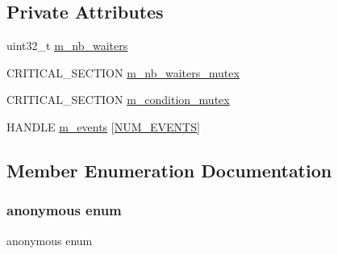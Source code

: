\subsection*{Private Attributes}
\begin{DoxyCompactItemize}
\item 
uint32\+\_\+t \hyperlink{classmage_1_1_condition_variable_ac02cb14000a597ec91b8546bdcbb9dd1}{m\+\_\+nb\+\_\+waiters}
\item 
C\+R\+I\+T\+I\+C\+A\+L\+\_\+\+S\+E\+C\+T\+I\+ON \hyperlink{classmage_1_1_condition_variable_a0686e682d62d44ff1eb9ac45acbb0eab}{m\+\_\+nb\+\_\+waiters\+\_\+mutex}
\item 
C\+R\+I\+T\+I\+C\+A\+L\+\_\+\+S\+E\+C\+T\+I\+ON \hyperlink{classmage_1_1_condition_variable_ab5ff870b2881a1979ccaec986d762441}{m\+\_\+condition\+\_\+mutex}
\item 
H\+A\+N\+D\+LE \hyperlink{classmage_1_1_condition_variable_aa3eeb3cf7cdcc70e651ee67800b713f5}{m\+\_\+events} \mbox{[}\hyperlink{classmage_1_1_condition_variable_a600fb5094237230f6b260b31d6fb0945a2c43161b9ddfb393865606bfb3a51fac}{N\+U\+M\+\_\+\+E\+V\+E\+N\+TS}\mbox{]}
\end{DoxyCompactItemize}


\subsection{Member Enumeration Documentation}
\hypertarget{classmage_1_1_condition_variable_a600fb5094237230f6b260b31d6fb0945}{}\label{classmage_1_1_condition_variable_a600fb5094237230f6b260b31d6fb0945} 
\subsubsection{\texorpdfstring{anonymous enum}{anonymous enum}}
{\footnotesize\ttfamily anonymous enum\hspace{0.3cm}{\ttfamily [private]}}

